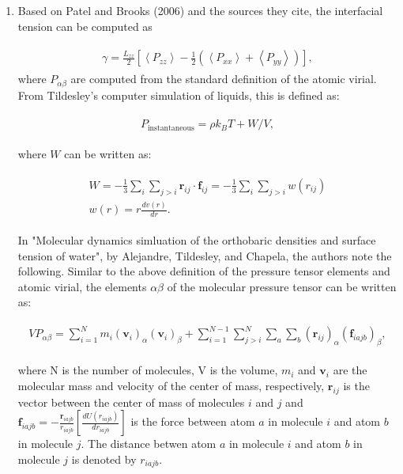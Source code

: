\documentclass[12pt,reqno]{amsart}
\numberwithin{equation}{section}
\begin{document}
\begin{enumerate}
\item Based on Patel and Brooks (2006) and the sources they cite, the interfacial tension can be computed as 

\begin{align}
\begin{split}
\gamma = \frac{L_{zz}}{2}\left[\left<P_{zz}\right> - \frac{1}{2}\left(\left<P_{xx}\right> + \left<P_{yy}\right>\right)\right], 
\end{split}
\end{align}
where $P_{\alpha\beta}$ are computed from the standard definition of the atomic virial.  From Tildesley's computer simulation of liquids, this is defined as:

\begin{align}
\begin{split}
P_{\text{instantaneous}} = \rho k_B T + W/V, 
\end{split}
\end{align}

where $W$ can be written as:

\begin{align}
\begin{split}
W = -\frac{1}{3}\sum_i\sum_{j > i}\textbf{r}_{ij}\cdot \textbf{f}_{ij} = -\frac{1}{3}\sum_i\sum_{j > i}w(r_{ij}) \\
w(r) = r\frac{dv(r)}{dr}.  
\end{split}
\end{align}

In "Molecular dynamics simluation of the orthobaric densities and surface tension of water", by Alejandre, Tildesley, and Chapela, the authors note the following.  Similar to the above definition of the pressure tensor elements and atomic virial, the elements $\alpha\beta$ of the molecular pressure tensor can be written as:

\begin{align}
\begin{split}
VP_{\alpha\beta} = \sum_{i = 1}^Nm_i(\textbf{v}_i)_\alpha(\textbf{v}_i)_\beta + \sum_{i = 1}^{N - 1}\sum_{j > i}^N\sum_a\sum_b(\textbf{r}_{ij})_\alpha(\textbf{f}_{iajb})_\beta, 
\end{split}
\end{align}

where N is the number of molecules, V is the volume, $m_i$ and $\textbf{v}_i$ are the molecular mass and velocity of the center of mass, respectively, $\textbf{r}_{ij}$ is the vector between the center of mass of molecules $i$ and $j$ and $\textbf{f}_{iajb} = -\frac{\textbf{r}_{iajb}}{r_{iajb}}\left[\frac{dU(r_{iajb})}{dr_{iajb}}\right]$ is the force between atom $a$ in molecule $i$ and atom $b$ in molecule $j$.  The distance betwen atom $a$ in molecule $i$ and atom $b$ in molecule $j$ is denoted by $r_{iajb}$.  


\end{enumerate}
\end{document}
